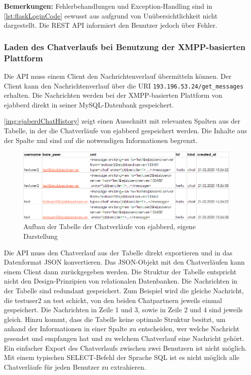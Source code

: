 \documentclass[a4paper,titlepage,halfparskip,12pt]{scrreprt}
\begin{document}
\begin{onehalfspacing}
\textbf{Bemerkungen:} Fehlerbehandlungen und Exception-Handling sind in \autoref{lst:flaskLoginCode} eewusst aus aufgrund von Unübersichtlichkeit nicht dargestellt. Die \acs{REST} \acs{API} informiert den Benutzer jedoch über Fehler.

\pagebreak

\subsubsection*{Laden des Chatverlaufs bei Benutzung der \acs{XMPP}-basierten Plattform}

Die \acs{API} muss einem Client den Nachrichtenverlauf übermitteln können. Der Client kann den Nachrichtenverlauf über die \acs{URI} \texttt{193.196.53.24/get\_messages} erhalten.  Die Nachrichten werden bei der \acs{XMPP}-basierten Plattform von ejabberd direkt in seiner MySQL-Datenbank gespeichert.

\autoref{img:ejaberdChatHistory} zeigt einen Ausschnitt mit relevanten Spalten aus der Tabelle, in der die Chatverläufe von ejabberd gespeichert werden. Die Inhalte aus der Spalte xml sind auf die notwendigen Informationen begrenzt.

\begin{figure}[h]
	\centering
	\includegraphics[width=\textwidth]{images/ejabberdChatHistory}
	\caption{Aufbau der Tabelle der Chatverläufe von ejabberd, eigene Darstellung}
	\label{img:ejaberdChatHistory}
\end{figure}

Die \acs{API} muss den Chatverlauf aus der Tabelle direkt exportieren und in das Datenformat \acs{JSON} konvertieren. Das \acs{JSON}-Objekt mit den Chatverläufen kann einem Client dann zurückgegeben werden. Die Struktur der Tabelle entspricht nicht den Design-Prinzipien von relationalen Datenbanken. Die Nachrichten in der Tabelle sind redundant gespeichert. Zum Beispiel wird die gleiche Nachricht, die testuser2 an test schickt, von den beiden Chatpartnern jeweils einmal gespeichert. Die Nachrichten in Zeile 1 und 3, sowie in Zeile 2 und 4 sind jeweils gleich. Hinzu kommt, dass die Tabelle keine optimale Struktur besitzt, um anhand der Informationen in einer Spalte zu entscheiden, wer welche Nachricht gesendet und empfangen hat und zu welchem Chatverlauf eine Nachricht gehört. Ein einfacher Export des Chatverlaufs zwischen zwei Benutzern ist nicht möglich. Mit einem typischen SELECT-Befehl der Sprache \acs{SQL} ist es nicht möglich alle Chatverläufe für jeden Benutzer zu extrahieren.


\end{onehalfspacing}
\end{document}
